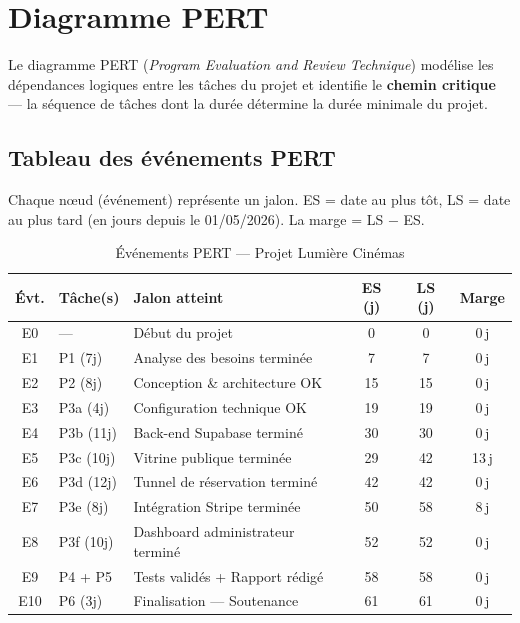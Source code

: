 \documentclass[12pt,a4paper,openany]{report}
\begin{document}
\section{Diagramme PERT}

Le diagramme PERT (\textit{Program Evaluation and Review Technique}) modélise les dépendances logiques entre les tâches du projet et identifie le \textbf{chemin critique} — la séquence de tâches dont la durée détermine la durée minimale du projet.

\subsection*{Tableau des événements PERT}

Chaque nœud (événement) représente un jalon. ES = date au plus tôt, LS = date au plus tard (en jours depuis le 01/05/2026). La marge = LS $-$ ES.

\begin{table}[H]
\centering
\small
\begin{tabular}{clp{5.2cm}ccc}
\toprule
\textbf{Évt.} & \textbf{Tâche(s)} & \textbf{Jalon atteint} & \textbf{ES (j)} & \textbf{LS (j)} & \textbf{Marge} \\
\midrule
E0  & ---        & Début du projet                  & 0  & 0  & 0\,j \\
E1  & P1 (7j)    & Analyse des besoins terminée     & 7  & 7  & 0\,j \\
E2  & P2 (8j)    & Conception \& architecture OK    & 15 & 15 & 0\,j \\
E3  & P3a (4j)   & Configuration technique OK       & 19 & 19 & 0\,j \\
E4  & P3b (11j)  & Back-end Supabase terminé        & 30 & 30 & 0\,j \\
E5  & P3c (10j)  & Vitrine publique terminée        & 29 & 42 & 13\,j \\
E6  & P3d (12j)  & Tunnel de réservation terminé    & 42 & 42 & 0\,j \\
E7  & P3e (8j)   & Intégration Stripe terminée      & 50 & 58 & 8\,j \\
E8  & P3f (10j)  & Dashboard administrateur terminé & 52 & 52 & 0\,j \\
E9  & P4 + P5    & Tests validés + Rapport rédigé   & 58 & 58 & 0\,j \\
E10 & P6 (3j)    & Finalisation — Soutenance        & 61 & 61 & 0\,j \\
\bottomrule
\end{tabular}
\caption{Événements PERT — Projet Lumière Cinémas}
\label{tab:pert}
\end{table}
\end{document}
